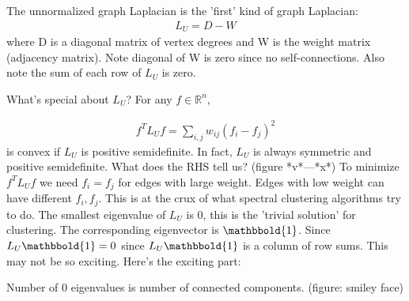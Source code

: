 \documentclass[11pt]{article}
\begin{document}
The unnormalized graph Laplacian is the 'first' kind of graph Laplacian:
\begin{align}
L_U = D - W
\end{align}
where D is a diagonal matrix of vertex degrees and W is the weight matrix (adjacency matrix).  Note diagonal of W is zero since no self-connections.  Also note the sum of each row of $L_U$ is zero.

What's special about $L_U$?
For any $f \in \mathbb{R}^n$, 

\begin{align}
f^TL_Uf=\sum_{i,j}w_{ij}(f_i-f_j)^2
\end{align}
is convex if $L_U$ is positive semidefinite.  In fact, $L_U$ is always symmetric and positive semidefinite.  What does the RHS tell us?  (figure *v*---*x*) To minimize $f^TL_Uf$ we need $f_i=f_j$ for edges with large weight.  Edges with low weight can have different $f_i,f_j$.  This is at the crux of what spectral clustering algorithms try to do.  The smallest eigenvalue of $L_U$ is 0, this is the 'trivial solution' for clustering.  The corresponding eigenvector is $\mathbbold{1}$.  Since $L_U\mathbbold{1}=0$ since $L_U\mathbbold{1}$ is a column of row sums.  This may not be so exciting.  Here's the exciting part:

Number of 0 eigenvalues is number of connected components.  (figure: smiley face)
%
%
\end{document}
